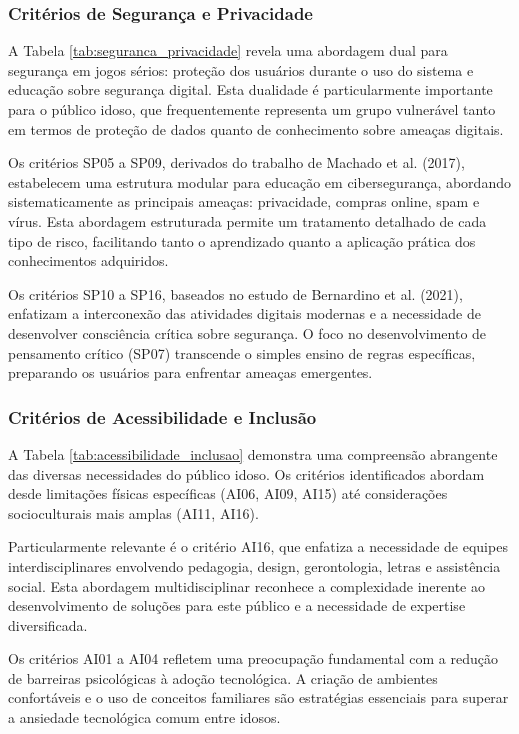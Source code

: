 \begin{table}[H]
\subsubsection{Critérios de Segurança e Privacidade}
\label{subsubsec:analise_seguranca}

A Tabela \ref{tab:seguranca_privacidade} revela uma abordagem dual para segurança em jogos sérios: proteção dos usuários durante o uso do sistema e educação sobre segurança digital. Esta dualidade é particularmente importante para o público idoso, que frequentemente representa um grupo vulnerável tanto em termos de proteção de dados quanto de conhecimento sobre ameaças digitais.

Os critérios SP05 a SP09, derivados do trabalho de Machado et al. (2017), estabelecem uma estrutura modular para educação em cibersegurança, abordando sistematicamente as principais ameaças: privacidade, compras online, spam e vírus. Esta abordagem estruturada permite um tratamento detalhado de cada tipo de risco, facilitando tanto o aprendizado quanto a aplicação prática dos conhecimentos adquiridos.

Os critérios SP10 a SP16, baseados no estudo de Bernardino et al. (2021), enfatizam a interconexão das atividades digitais modernas e a necessidade de desenvolver consciência crítica sobre segurança. O foco no desenvolvimento de pensamento crítico (SP07) transcende o simples ensino de regras específicas, preparando os usuários para enfrentar ameaças emergentes.

\subsubsection{Critérios de Acessibilidade e Inclusão}
\label{subsubsec:analise_acessibilidade}

A Tabela \ref{tab:acessibilidade_inclusao} demonstra uma compreensão abrangente das diversas necessidades do público idoso. Os critérios identificados abordam desde limitações físicas específicas (AI06, AI09, AI15) até considerações socioculturais mais amplas (AI11, AI16).

Particularmente relevante é o critério AI16, que enfatiza a necessidade de equipes interdisciplinares envolvendo pedagogia, design, gerontologia, letras e assistência social. Esta abordagem multidisciplinar reconhece a complexidade inerente ao desenvolvimento de soluções para este público e a necessidade de expertise diversificada.

Os critérios AI01 a AI04 refletem uma preocupação fundamental com a redução de barreiras psicológicas à adoção tecnológica. A criação de ambientes confortáveis e o uso de conceitos familiares são estratégias essenciais para superar a ansiedade tecnológica comum entre idosos.


\end{table}
